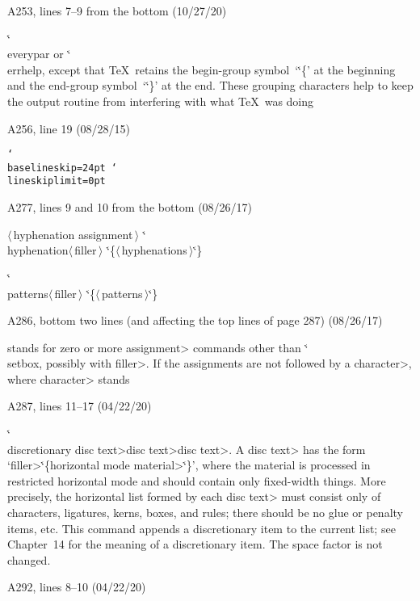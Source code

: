 \bugonpage A253, lines 7--9 from the bottom (10/27/20)

\ninepoint\indent
\.{\char`\\everypar} or \.{\char`\\errhelp}, except that \TeX\
retains the begin-group symbol~`\.{\char`\{}' at the beginning
and the end-group symbol~`\.{\char`\}}' at the end. These
grouping characters
help to keep the output routine from interfering with what
\TeX\ was doing\cutpar

\bugonpage A256, line 19 (08/28/15)

\ninepoint\indent
\tt \char`\\baselineskip=24pt \char`\\lineskiplimit=0pt

\bugonpage A277, lines 9 and 10 from the bottom (08/26/17)

\ninepoint\indent
$\langle\,$hyphenation assignment$\,\rangle$\is
 \.{\char`\\hyphenation}$\langle\,$filler$\,\rangle$%
 \.{\char`\{}$\langle\,$hyphenations$\,\rangle$\.{\char`\}}\par
\qquad \alt \.{\char`\\patterns}$\langle\,$filler$\,\rangle$%
 \.{\char`\{}$\langle\,$patterns$\,\rangle$\.{\char`\}}

\bugonpage A286, bottom two lines {(and affecting the top lines
of page 287)} (08/26/17)

\ninepoint\noindent
stands for zero or more \<assignment>
commands other than \.{\char`\\setbox}, possibly with \<filler>.
If the assignments are not followed by a \<character>, where
\<character> stands\cutpar

\bugonpage A287, lines 11--17  (04/22/20)

\ninepoint
\textindent{$\bull$} \.{\char`\\discretionary}%
  \<disc text>\<disc text>\<disc text>.\enskip
A \<disc text> has the form
`\<filler>\.{\char`\{}\<horizontal mode material>\.{\char`\}}',
where the material is processed in restricted horizontal mode and
should contain only fixed-width things.
More precisely, the horizontal list formed by each
\<disc text> must consist only of characters, ligatures,
kerns, boxes, and rules; there should be no glue or penalty items, etc.
This command appends a discretionary item to the current list; see
Chapter~14 for the meaning of a discretionary item. The space factor is
not changed.

\bugonpage A292, lines 8--10 (04/22/20)


